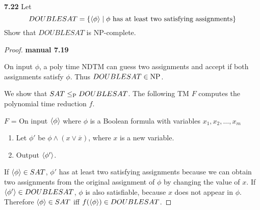 \label{lang:DOUBLESAT_NP}
\label{lang:DOUBLESAT_NPC}
\textbf{7.22} Let 
\[
DOUBLESAT= \{ \desc{\phi} \mid \text{$\phi$ has at least two satisfying assignments} \}
\]
Show that $DOUBLESAT$ is NP-complete.
\begin{mdframed}
\begin{proof}
\textbf{manual 7.19}

On input $\phi$, a poly time NDTM can guess two assignments and accept if both assignments satisfy $\phi$. Thus $DOUBLESAT \in \NP$.

We show that $SAT \leq_\P DOUBLESAT$. The following TM $F$ computes the polynomial time reduction $f$.

\medskip
$F$ = On input $\desc{\phi}$ where $\phi$ is a Boolean formula with variables $x_1, x_2, \ldots, x_m$
\begin{enumerate}
\item Let $\phi'$ be $\phi \wedge (x \vee \overline{x})$, where $x$ is a new variable.
\item Output $\desc{\phi'}$.
\end{enumerate}

If $\desc{\phi} \in SAT$, $\phi'$ has at least two satisfying assignments because we can obtain two assignments from the original assignment of $\phi$ by changing the value of $x$. If $\desc{\phi'} \in DOUBLESAT$, $\phi$ is also satisfiable, because $x$ does not appear in $\phi$. Therefore $\desc{\phi} \in SAT$ iff $f(\desc{\phi}) \in DOUBLESAT$.
\end{proof}
\end{mdframed}

